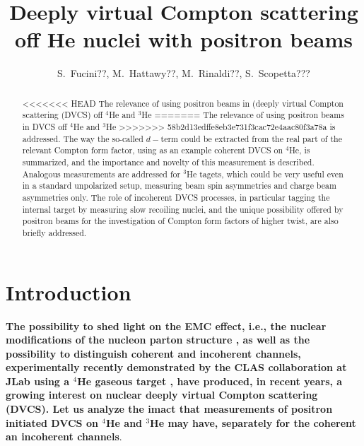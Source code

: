 \documentclass[times, twoside]{PosWhiPap}
\begin{document}
\title{Deeply virtual Compton scattering off He nuclei with positron beams}

\author[]
{S.~Fucini??, M.~Hattawy??, M.~Rinaldi??, S.~Scopetta???  }


\maketitle

\begin{abstract}
<<<<<<< HEAD
The relevance of using positron beams in (deeply virtual Compton scattering (DVCS) off $^4$He and $^3$He 
=======
The relevance of using positron beams in DVCS off $^4$He and $^3$He 
>>>>>>> 58b2d13edffe8eb3e731f3cac72e4aac80f3a78a
   is addressed. The way the so-called $d-$term could be extracted from the 
   real part of the relevant Compton form factor, using as an example coherent 
   DVCS on $^4$He, is summarized, and the importance and novelty of this measurement is described. Analogous measurements are addressed for $^3$He tagets,
   which could be very useful even in a standard unpolarized setup, measuring beam spin asymmetries and charge beam asymmetries only.
   The role of incoherent  
   DVCS processes, in particular tagging the internal target by measuring slow recoiling nuclei,  and the unique possibility offered by positron beams for the 
   investigation of Compton form factors of higher twist, are also  briefly 
   addressed.
\end {abstract}



\section*{Introduction}
{\bf
The possibility to shed 
   light on the EMC effect, i.e., the nuclear modifications of the nucleon 
   parton structure \cite{Dupre:2015jha, Cloet:2019mql}, as well as
   the possibility to distinguish coherent and incoherent 
   channels, experimentally recently demonstrated by 
   the CLAS collaboration at JLab using a $^4$He gaseous target
     \cite{Hattawy:2017woc, Hattawy:2018liu},
   have produced, in recent years, a growing interest on nuclear deeply virtual Compton scattering (DVCS). Let us analyze
   the imact that measurements of positron initiated DVCS on $^4$He and $^3$He may have, separately for the coherent an incoherent channels}.
\end{document}
